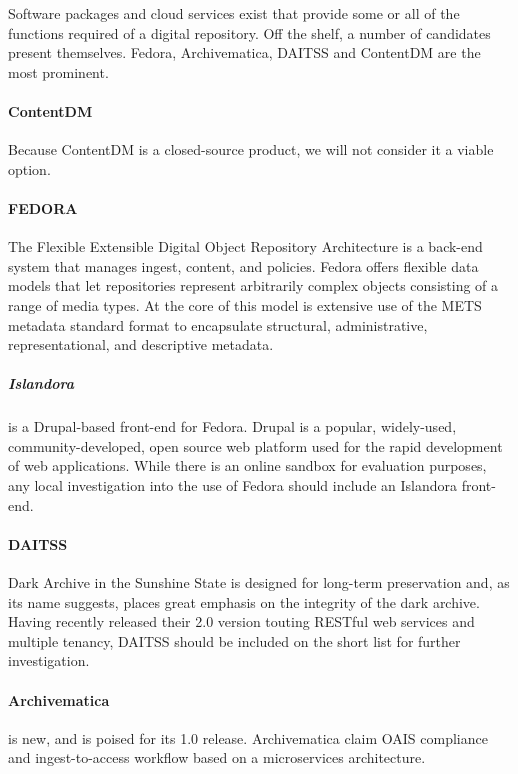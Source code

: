 Software packages and cloud services exist that provide some or all of the functions required of a digital repository. Off the shelf, a number of candidates present themselves. Fedora, Archivematica, DAITSS and ContentDM are the most prominent. 
\paragraph{ContentDM}
Because ContentDM is a closed-source product, we will not consider it a viable option. 
\paragraph{FEDORA}The Flexible Extensible Digital Object Repository Architecture is a back-end system that manages ingest, content, and policies. Fedora offers flexible data models that let repositories represent arbitrarily complex objects consisting of a range of media types. At the core of this model is extensive use of the METS metadata standard format to encapsulate structural, administrative, representational, and descriptive metadata\cite{fedora-meta-phil}.
\subparagraph{Islandora} is a Drupal-based front-end for Fedora. Drupal is a popular, widely-used, community-developed, open source web platform used for the rapid development of web applications. While there is an online sandbox\cite{islandora-sandbox} for evaluation purposes, any local investigation into the use of Fedora should include an Islandora front-end.
\paragraph{DAITSS}Dark Archive in the Sunshine State is designed for long-term preservation\cite{daitss} and, as its name suggests, places great emphasis on the integrity of the dark archive. Having recently released their 2.0 version touting RESTful web services and multiple tenancy, DAITSS should be included on the short list for further investigation. 
\paragraph{Archivematica} is new, and is poised for its 1.0 release. Archivematica claim OAIS compliance\cite{archivematica-main} and ingest-to-access workflow based on a microservices architecture.